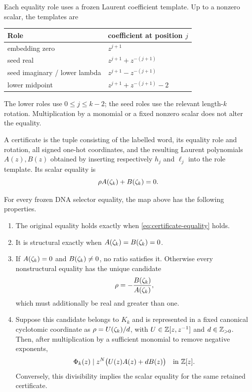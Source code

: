Each equality role uses a frozen Laurent coefficient template.  Up to a
nonzero scalar, the templates are
\begin{center}
\begin{tabular}{ll}
\toprule
Role & coefficient at position $j$ \\
\midrule
embedding zero & $z^{j+1}$ \\
seed real & $z^{j+1}+z^{-(j+1)}$ \\
seed imaginary / lower lambda & $z^{j+1}-z^{-(j+1)}$ \\
lower midpoint & $z^{j+1}+z^{-(j+1)}-2$ \\
\bottomrule
\end{tabular}
\end{center}
The lower roles use $0\le j\le k-2$; the seed roles use the relevant
length-$k$ rotation.  Multiplication by a monomial or a fixed nonzero scalar
does not alter the equality.

\begin{definition}
A certificate is the tuple consisting of the labelled word, its equality
role and rotation, all signed one-hot coordinates, and the resulting Laurent
polynomials $A(z),B(z)$ obtained by inserting respectively $h_j$ and
$\ell_j$ into the role template.  Its scalar equality is
\begin{equation}
  \rho A(\zeta_k)+B(\zeta_k)=0.                                            \label{eq:certificate-equality}
\end{equation}
\end{definition}

\begin{theorem}
\label{thm:dna-certificate}
For every frozen DNA selector equality, the map above has the following
properties.
\begin{enumerate}
  \item The original equality holds exactly when
        \eqref{eq:certificate-equality} holds.
  \item It is structural exactly when $A(\zeta_k)=B(\zeta_k)=0$.
  \item If $A(\zeta_k)=0$ and $B(\zeta_k)\ne0$, no ratio satisfies it.
        Otherwise every nonstructural equality has the unique candidate
        \[
          \rho=-\frac{B(\zeta_k)}{A(\zeta_k)},
        \]
        which must additionally be real and greater than one.
  \item Suppose this candidate belongs to $K_k$ and is represented in a
        fixed canonical cyclotomic coordinate as
        $\rho=U(\zeta_k)/d$, with $U\in\mathbb Z[z,z^{-1}]$ and $d\in\mathbb Z_{>0}$.
        Then, after multiplication by a sufficient monomial to remove
        negative exponents,
        \begin{equation}
          \Phi_k(z)\mid z^N\bigl(U(z)A(z)+dB(z)\bigr)\quad\text{in }\mathbb Z[z]. \label{eq:certificate-divisibility}
        \end{equation}
        Conversely, this divisibility implies the scalar equality for the
        same retained certificate.
\end{enumerate}
\end{theorem}

